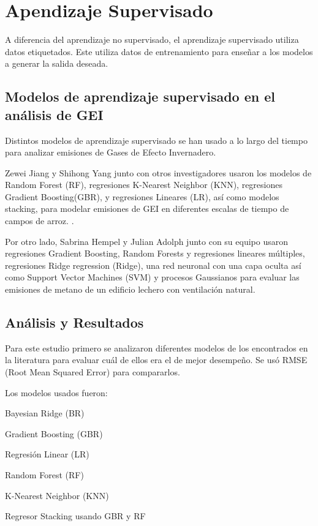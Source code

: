 \documentclass[13.6pt]{article}
\let\tempone\itemize
\let\temptwo\enditemize
\renewenvironment{itemize}{\tempone\setlength{\itemsep}{0pt}}{\temptwo}
\begin{document}

\section{Apendizaje Supervisado}

A diferencia del aprendizaje no supervisado, el aprendizaje supervisado utiliza datos etiquetados. Este utiliza datos de entrenamiento para enseñar a los modelos a generar la salida deseada.

\subsection{Modelos de aprendizaje supervisado en el análisis de GEI}

Distintos modelos de aprendizaje supervisado se han usado a lo largo del tiempo para analizar emisiones de Gases de Efecto Invernadero.

Zewei Jiang y Shihong Yang junto con otros investigadores usaron los modelos de Random Forest (RF), regresiones K-Nearest Neighbor (KNN), regresiones Gradient Boosting(GBR), y regresiones Lineares (LR), así como modelos stacking, para modelar emisiones de GEI en diferentes escalas de tiempo de campos de arroz. \citep{JIANG2023108821} .

Por otro lado, Sabrina Hempel y Julian Adolph junto con su equipo usaron regresiones Gradient Boosting, Random Forests y regresiones lineares múltiples, regresiones Ridge regression (Ridge), una red neuronal con una capa oculta así como Support Vector Machines (SVM) y procesos Gaussianos para evaluar las emisiones de metano de un edificio lechero con ventilación natural. \citep{app10196938}


\subsection{Análisis y Resultados}

Para este estudio primero se analizaron diferentes modelos de los encontrados en la literatura para evaluar cuál de ellos era el de mejor desempeño. Se usó RMSE (Root Mean Squared Error) para compararlos.

Los modelos usados fueron:

\begin{itemize}
\item Bayesian Ridge (BR)
\item Gradient Boosting (GBR)
\item Regresión Linear (LR)
\item Random Forest (RF)
\item K-Nearest Neighbor (KNN)
\item Regresor Stacking usando GBR y RF
\end{itemize}
\end{document}
